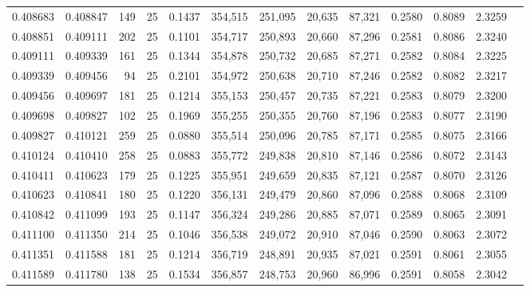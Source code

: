 \begin{tabular}{rrrrrrrrrrrrr}
0.408683 & 0.408847 &   149 &  25 &                                     0.1437 & 354,515 & 251,095 &  20,635 &  87,321 & 0.2580 & 0.8089 & 2.3259 \\
0.408851 & 0.409111 &   202 &  25 &                                     0.1101 & 354,717 & 250,893 &  20,660 &  87,296 & 0.2581 & 0.8086 & 2.3240 \\
0.409111 & 0.409339 &   161 &  25 &                                     0.1344 & 354,878 & 250,732 &  20,685 &  87,271 & 0.2582 & 0.8084 & 2.3225 \\
0.409339 & 0.409456 &    94 &  25 &                                     0.2101 & 354,972 & 250,638 &  20,710 &  87,246 & 0.2582 & 0.8082 & 2.3217 \\
0.409456 & 0.409697 &   181 &  25 &                                     0.1214 & 355,153 & 250,457 &  20,735 &  87,221 & 0.2583 & 0.8079 & 2.3200 \\
0.409698 & 0.409827 &   102 &  25 &                                     0.1969 & 355,255 & 250,355 &  20,760 &  87,196 & 0.2583 & 0.8077 & 2.3190 \\
0.409827 & 0.410121 &   259 &  25 &                                     0.0880 & 355,514 & 250,096 &  20,785 &  87,171 & 0.2585 & 0.8075 & 2.3166 \\
0.410124 & 0.410410 &   258 &  25 &                                     0.0883 & 355,772 & 249,838 &  20,810 &  87,146 & 0.2586 & 0.8072 & 2.3143 \\
0.410411 & 0.410623 &   179 &  25 &                                     0.1225 & 355,951 & 249,659 &  20,835 &  87,121 & 0.2587 & 0.8070 & 2.3126 \\
0.410623 & 0.410841 &   180 &  25 &                                     0.1220 & 356,131 & 249,479 &  20,860 &  87,096 & 0.2588 & 0.8068 & 2.3109 \\
0.410842 & 0.411099 &   193 &  25 &                                     0.1147 & 356,324 & 249,286 &  20,885 &  87,071 & 0.2589 & 0.8065 & 2.3091 \\
0.411100 & 0.411350 &   214 &  25 &                                     0.1046 & 356,538 & 249,072 &  20,910 &  87,046 & 0.2590 & 0.8063 & 2.3072 \\
0.411351 & 0.411588 &   181 &  25 &                                     0.1214 & 356,719 & 248,891 &  20,935 &  87,021 & 0.2591 & 0.8061 & 2.3055 \\
0.411589 & 0.411780 &   138 &  25 &                                     0.1534 & 356,857 & 248,753 &  20,960 &  86,996 & 0.2591 & 0.8058 & 2.3042 \\

\end{tabular}
